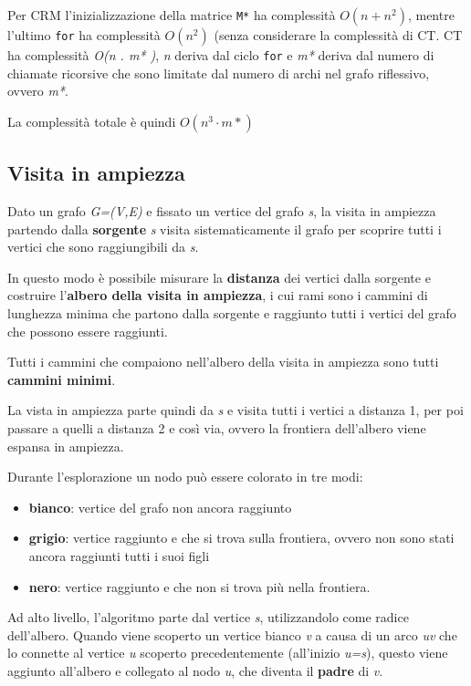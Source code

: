 Per \textsc{CRM} l'inizializzazione della matrice \texttt{M*} ha
complessità $O(n+n^2)$, mentre l'ultimo
\texttt{for} ha complessità $O(n^2)$ (senza considerare la complessità
di \textsc{CT}. \textsc{CT} ha complessità \emph{O(n . m* )}, \emph{n}
deriva dal ciclo \texttt{for} e \emph{m*} deriva dal numero di chiamate
ricorsive che sono limitate dal numero di archi nel grafo riflessivo,
ovvero \emph{m*}.

La complessità totale è quindi $O(n^3 \cdot m*)$

\subsection{Visita in ampiezza}\label{visita-in-ampiezza}

Dato un grafo \emph{G=(V,E)} e fissato un vertice del grafo \emph{s}, la
visita in ampiezza partendo dalla \textbf{sorgente} \emph{s} visita
sistematicamente il grafo per scoprire tutti i vertici che sono
raggiungibili da \emph{s}.

In questo modo è possibile misurare la \textbf{distanza} dei vertici
dalla sorgente e costruire l'\textbf{albero della visita in ampiezza}, i
cui rami sono i cammini di lunghezza minima che partono dalla sorgente e
raggiunto tutti i vertici del grafo che possono essere raggiunti.

Tutti i cammini che compaiono nell'albero della visita in ampiezza sono
tutti \textbf{cammini minimi}.

La vista in ampiezza parte quindi da \emph{s} e visita tutti i vertici a
distanza 1, per poi passare a quelli a distanza 2 e così via, ovvero la
frontiera dell'albero viene espansa in ampiezza.

Durante l'esplorazione un nodo può essere colorato in tre modi:

\begin{itemize}
\tightlist
\item
  \textbf{bianco}: vertice del grafo non ancora raggiunto
\item
  \textbf{grigio}: vertice raggiunto e che si trova sulla frontiera,
  ovvero non sono stati ancora raggiunti tutti i suoi figli
\item
  \textbf{nero}: vertice raggiunto e che non si trova più nella
  frontiera.
\end{itemize}

Ad alto livello, l'algoritmo parte dal vertice \emph{s}, utilizzandolo
come radice dell'albero. Quando viene scoperto un vertice bianco
\emph{v} a causa di un arco \emph{uv} che lo connette al vertice \emph{u}
scoperto precedentemente (all'inizio \emph{u=s}), questo viene aggiunto
all'albero e collegato al nodo \emph{u}, che diventa il \textbf{padre}
di \emph{v}.

